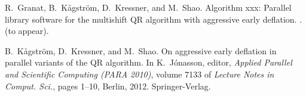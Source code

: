 \documentclass{article}
\begin{document}
\begin{thebibliography}{10}
R.~Granat, B.~K{\aa}gstr\"om, D.~Kressner, and M.~Shao.
\newblock Algorithm xxx: Parallel library software for the multishift {QR} algorithm with
  aggressive early deflation.
.
\newblock (to appear).

B.~K{\aa}gstr\"om, D.~Kressner, and M.~Shao.
\newblock On aggressive early deflation in parallel variants of the {QR}
  algorithm.
\newblock In K.~J\'onasson, editor, {\em Applied Parallel and Scientific
  Computing (PARA 2010)}, volume 7133 of {\em Lecture Notes in Comput. Sci.},
  pages 1--10, Berlin, 2012. Spring{\-}er-Ver{\-}lag.

\end{thebibliography}
\end{document}
